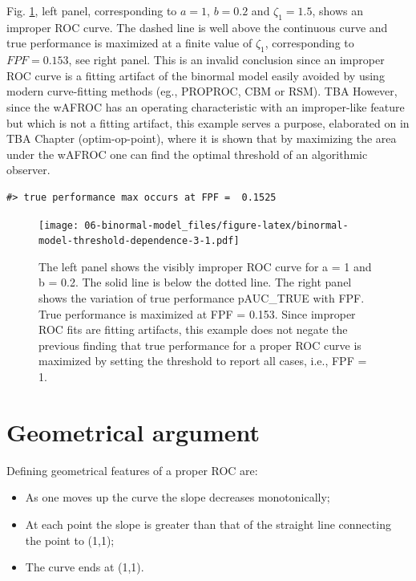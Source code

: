 \documentclass[
]{book}
\providecommand{\tightlist}{%
  \setlength{\itemsep}{0pt}\setlength{\parskip}{0pt}}
\begin{document}
Fig. \ref{fig:binormal-model-threshold-dependence-3}, left panel, corresponding to \(a = 1\), \(b = 0.2\) and \(\zeta_1 = 1.5\), shows an improper ROC curve. The dashed line is well above the continuous curve and true performance is maximized at a finite value of \(\zeta_1\), corresponding to \(FPF = 0.153\), see right panel. This is an invalid conclusion since an improper ROC curve is a fitting artifact of the binormal model easily avoided by using modern curve-fitting methods (eg., PROPROC, CBM or RSM). TBA However, since the wAFROC has an operating characteristic with an improper-like feature but which is not a fitting artifact, this example serves a purpose, elaborated on in TBA Chapter (optim-op-point), where it is shown that by maximizing the area under the wAFROC one can find the optimal threshold of an algorithmic observer.

\begin{verbatim}
#> true performance max occurs at FPF =  0.1525
\end{verbatim}

\begin{figure}
\centering
\texttt{[image: 06-binormal-model\_files/figure-latex/binormal-model-threshold-dependence-3-1.pdf]}
\caption{\label{fig:binormal-model-threshold-dependence-3}The left panel shows the visibly improper ROC curve for a = 1 and b = 0.2. The solid line is below the dotted line. The right panel shows the variation of true performance pAUC\_TRUE with FPF. True performance is maximized at FPF = 0.153. Since improper ROC fits are fitting artifacts, this example does not negate the previous finding that true performance for a proper ROC curve is maximized by setting the threshold to report all cases, i.e., FPF = 1.}
\end{figure}

\hypertarget{binormal-model-geometrical-argument}{%
\section{Geometrical argument}\label{binormal-model-geometrical-argument}}

Defining geometrical features of a proper ROC are:

\begin{itemize}
\tightlist
\item
  As one moves up the curve the slope decreases monotonically;
\item
  At each point the slope is greater than that of the straight line connecting the point to (1,1);
\item
  The curve ends at (1,1).
\end{itemize}
\end{document}
